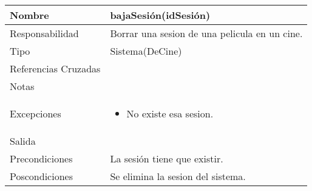 \documentclass{article}
\begin{document}
\begin{table}[h]
\begin{tabular}{|l|l|l|l|l|l|}
\hline
\multicolumn{2}{|p{3cm}|}{Nombre} & \multicolumn{4}{p{10cm}|}{\textbf{bajaSesión(idSesión)}}\\
\hline
\multicolumn{2}{|p{3cm}|}{Responsabilidad} & \multicolumn{4}{p{10cm}|}{Borrar una sesion de una pelicula en un cine.} \\
\hline
\multicolumn{2}{|p{3cm}|}{Tipo} & \multicolumn{4}{p{10cm}|}{Sistema(DeCine)} \\
\hline
\multicolumn{2}{|p{3cm}|}{Referencias Cruzadas} & \multicolumn{4}{p{10cm}|}{} \\
\hline
\multicolumn{2}{|p{3cm}|}{Notas} & \multicolumn{4}{p{10cm}|}{} \\
\hline
\multicolumn{2}{|p{3cm}|}{Excepciones} & \multicolumn{4}{p{10cm}|}{\begin{itemize}
\item No existe esa sesion.
\end{itemize}} \\
\hline
\multicolumn{2}{|p{3cm}|}{Salida} & \multicolumn{4}{p{10cm}|}{} \\
\hline
\multicolumn{2}{|p{3cm}|}{Precondiciones} & \multicolumn{4}{p{10cm}|}{La sesión tiene que existir.} \\
\hline
\multicolumn{2}{|p{3cm}|}{Poscondiciones} & \multicolumn{4}{p{10cm}|}{Se elimina la sesion del sistema.} \\
\hline
\end{tabular}
\end{table}
\end{document}

